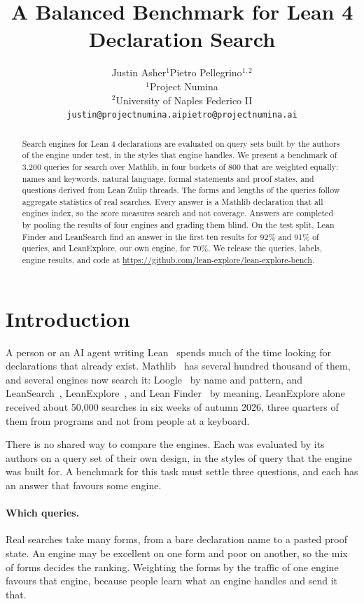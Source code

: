 \documentclass{article}
\title{A Balanced Benchmark for Lean 4 Declaration Search}
\author{%
  Justin Asher$^{1}$\hspace{1.4em}Pietro Pellegrino$^{1,2}$ \\[1.2ex]
  \small\normalfont $^{1}$Project Numina \\[0.3ex]
  \small\normalfont $^{2}$University of Naples Federico II \\[0.8ex]
  \small\normalfont \texttt{justin@projectnumina.ai}\hspace{1.4em}\texttt{pietro@projectnumina.ai}
}
\begin{document}
\maketitle

\begin{abstract}
Search engines for Lean 4 declarations are evaluated on query sets built by
the authors of the engine under test, in the styles that engine handles. We
present a benchmark of 3,200 queries for search over Mathlib, in four buckets
of 800 that are weighted equally: names and keywords, natural language, formal
statements and proof states, and questions derived from Lean Zulip threads.
The forms and lengths of the queries follow aggregate statistics of real
searches. Every answer is a Mathlib declaration that all engines index, so the
score measures search and not coverage. Answers are completed by pooling the
results of four engines and grading them blind. On the test split, Lean Finder
and LeanSearch find an answer in the first ten results for 92\% and 91\% of
queries, and LeanExplore, our own engine, for 70\%. We release the queries,
labels, engine results, and code at
\url{https://github.com/lean-explore/lean-explore-bench}.
\end{abstract}

\section{Introduction}

A person or an AI agent writing Lean~\cite{moura2021lean4} spends much of the
time looking for declarations that already exist. Mathlib~\cite{mathlib2019}
has several hundred thousand of them, and several engines now search it:
Loogle~\cite{breitner2023loogle} by name and pattern, and
LeanSearch~\cite{gao2024leansearch,gao2026leansearchv2},
LeanExplore~\cite{asher2025leanexplore}, and Lean
Finder~\cite{lu2025leanfinder} by meaning. LeanExplore alone received about
50,000 searches in six weeks of autumn 2026, three quarters of them from
programs and not from people at a keyboard.

There is no shared way to compare the engines. Each was evaluated by its
authors on a query set of their own design, in the styles of query that the
engine was built for. A benchmark for this task must settle three questions,
and each has an answer that favours some engine.

\paragraph{Which queries.} Real searches take many forms, from a bare
declaration name to a pasted proof state. An engine may be excellent on one
form and poor on another, so the mix of forms decides the ranking. Weighting
the forms by the traffic of one engine favours that engine, because people
learn what an engine handles and send it that.
\end{document}
